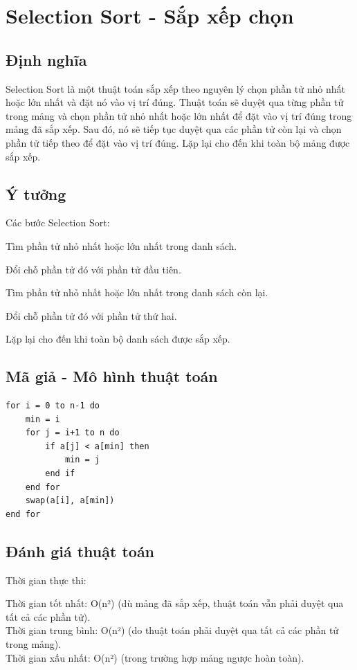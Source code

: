 \documentclass[12pt,a4paper]{report}
\begin{document}
\section{ Selection Sort - Sắp xếp chọn}
 
\subsection{ Định nghĩa}

{\large \hspace{1cm} Selection Sort là một thuật toán sắp xếp theo nguyên lý chọn phần tử nhỏ nhất hoặc lớn nhất và đặt nó vào vị trí đúng. Thuật toán sẽ duyệt qua từng phần tử trong mảng và chọn phần tử nhỏ nhất hoặc lớn nhất để đặt vào vị trí đúng trong mảng đã sắp xếp. Sau đó, nó sẽ tiếp tục duyệt qua các phần tử còn lại và chọn phần tử tiếp theo để đặt vào vị trí đúng. Lặp lại cho đến khi toàn bộ mảng được sắp xếp.}

\subsection{ Ý tưởng}

Các bước Selection Sort:

Tìm phần tử nhỏ nhất hoặc lớn nhất trong danh sách.

Đổi chỗ phần tử đó với phần tử đầu tiên.

Tìm phần tử nhỏ nhất hoặc lớn nhất trong danh sách còn lại.

Đổi chỗ phần tử đó với phần tử thứ hai.

Lặp lại cho đến khi toàn bộ danh sách được sắp xếp.

\subsection{ Mã giả - Mô hình thuật toán}

\begin{lstlisting}
for i = 0 to n-1 do
    min = i
    for j = i+1 to n do
        if a[j] < a[min] then
            min = j
        end if
    end for
    swap(a[i], a[min])
end for
\end{lstlisting}

\subsection{ Đánh giá thuật toán}

{Thời gian thực thi:

\hspace{0.5cm} Thời gian tốt nhất: O(n²) (dù mảng đã sắp xếp, thuật toán vẫn phải duyệt qua tất cả các phần tử).\\

\hspace{0.5cm} Thời gian trung bình: O(n²) (do thuật toán phải duyệt qua tất cả các phần tử trong mảng).\\

\hspace{0.5cm} Thời gian xấu nhất: O(n²) (trong trường hợp mảng ngược hoàn toàn).\\}
\end{document}

